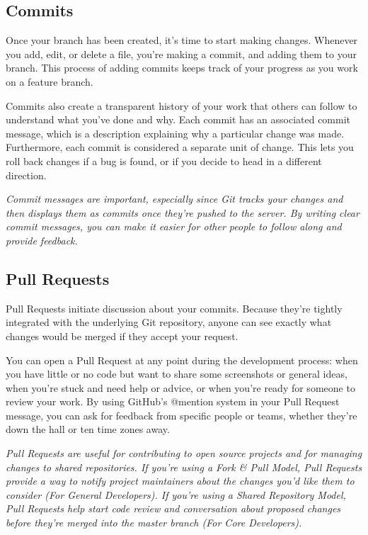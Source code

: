 \documentclass[runningheads,letterpaper]{llncs}
\begin{document}
\subsection{Commits}

Once your branch has been created, it's time to start making changes.
Whenever you add, edit, or delete a file, you're making a commit, and adding them to your branch.
This process of adding commits keeps track of your progress as you work on a feature branch.

Commits also create a transparent history of your work that others can follow to understand what you've done and why.
Each commit has an associated commit message, which is a description explaining why a particular change was made.
Furthermore, each commit is considered a separate unit of change.
This lets you roll back changes if a bug is found, or if you decide to head in a different direction.

{\it Commit messages are important, especially since Git tracks your changes and then displays them as commits once they're pushed to the server. By writing clear commit messages, you can make it easier for other people to follow along and provide feedback.}

\subsection{Pull Requests}

Pull Requests initiate discussion about your commits.
Because they're tightly integrated with the underlying Git repository, anyone can see exactly what changes would be merged if they accept your request.

You can open a Pull Request at any point during the development process: when you have little or no code but want to share some screenshots or general ideas, when you're stuck and need help or advice, or when you're ready for someone to review your work.
By using GitHub's @mention system in your Pull Request message, you can ask for feedback from specific people or teams, whether they're down the hall or ten time zones away.

{\it Pull Requests are useful for contributing to open source projects and for managing changes to shared repositories.
If you're using a Fork \& Pull Model, Pull Requests provide a way to notify project maintainers about the changes you'd like them to consider (For General Developers).
If you're using a Shared Repository Model, Pull Requests help start code review and conversation about proposed changes before they're merged into the master branch (For Core Developers).}
\end{document}
